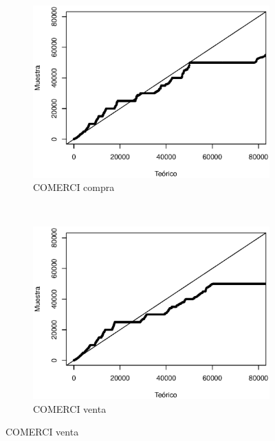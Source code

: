 \documentclass[11pt]{article}
\numberwithin{equation}{section} %
\begin{document}
\begin{figure}[htbp]
\begin{subfigure}[b]{0.5\textwidth}
\centering
\includegraphics[width=\textwidth, trim=0 0.5cm 0 1cm]{comercivolumencompraqq.eps}
\caption{COMERCI compra}
\label{fig:comercivolumencompraqq}
\end{subfigure}%
~ %
\begin{subfigure}[b]{0.5\textwidth}
\centering
\includegraphics[width=\textwidth, trim=0 0.5cm 0 1cm]{comercivolumenventaqq.eps}
\caption{COMERCI venta}
\label{fig:comercivolumenventaqq}
\end{subfigure}


\end{figure}
\end{document}
